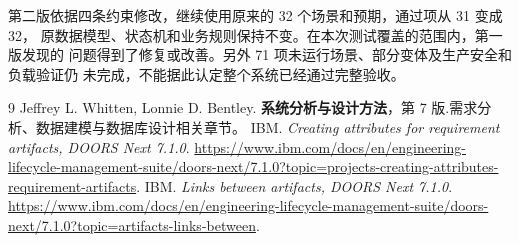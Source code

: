 \documentclass[UTF8,a4paper,12pt]{ctexart}
\begin{document}
第二版依据四条约束修改，继续使用原来的 32 个场景和预期，通过项从 31 变成 32，
原数据模型、状态机和业务规则保持不变。在本次测试覆盖的范围内，第一版发现的
问题得到了修复或改善。另外 71 项未运行场景、部分变体及生产安全和负载验证仍
未完成，不能据此认定整个系统已经通过完整验收。

\begingroup\small{}
\begin{thebibliography}{9}
Jeffrey L. Whitten, Lonnie D. Bentley.\newblock
\textbf{系统分析与设计方法}，第 7 版.\newblock 需求分析、数据建模与数据库设计相关章节。
IBM.\newblock
\emph{Creating attributes for requirement artifacts, DOORS Next 7.1.0}.\newblock
\url{https://www.ibm.com/docs/en/engineering-lifecycle-management-suite/doors-next/7.1.0?topic=projects-creating-attributes-requirement-artifacts}.
IBM.\newblock
\emph{Links between artifacts, DOORS Next 7.1.0}.\newblock
\url{https://www.ibm.com/docs/en/engineering-lifecycle-management-suite/doors-next/7.1.0?topic=artifacts-links-between}.
\end{thebibliography}\endgroup
\end{document}
